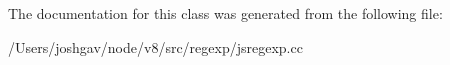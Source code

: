The documentation for this class was generated from the following file\+:\begin{DoxyCompactItemize}
\item 
/\+Users/joshgav/node/v8/src/regexp/jsregexp.\+cc\end{DoxyCompactItemize}
